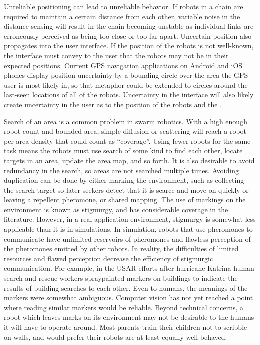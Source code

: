 \documentclass[]{article}
\begin{document}
Unreliable positioning can lead to unreliable behavior. 
If robots in a chain are required to maintain a certain distance from each other, variable noise in the distance sensing will result in the chain becoming unstable as individual links are erroneously perceived as being too close or too far apart. 
Uncertain position also propagates into the user interface. 
If the position of the robots is not well-known, the interface must convey to the user that the robots may not be in their expected positions. 
Current GPS navigation applications on Android and iOS phones display position uncertainty by a bounding circle over the area the GPS user is most likely in, so that metaphor could be extended to circles around the last-seen locations of all of the robots. 
Uncertainty in the interface will also likely create uncertainty in the user as to the position of the robots and the . 

Search of an area is a common problem in swarm robotics.
With a high enough robot count and bounded area, simple diffusion or scattering will reach a robot per area density that could count as ``coverage''. 
Using fewer robots for the same task means the robots must use search of some kind to find each other, locate targets in an area, update the area map, and so forth. 
It is also desirable to avoid redundancy in the search, so areas are not searched multiple times.
Avoiding duplication can be done by either marking the environment, such as collecting the search target so later seekers detect that it is scarce and move on quickly or leaving a repellent pheromone, or shared mapping.
The use of markings on the environment is known as stigmurgy, and has considerable coverage in the literature. 
However, in a real application environment, stigmurgy is somewhat less applicable than it is in simulations. 
In simulation, robots that use pheromones to communicate have unlimited reservoirs of pheromones and flawless perception of the pheromones emitted by other robots. 
In reality, the difficulties of limited resources and flawed perception decrease the efficiency of stigmurgic communication. 
For example, in the USAR efforts after hurricane Katrina human search and rescue workers spraypainted markers on buildings to indicate the results of building searches to each other. 
Even to humans, the meanings of the markers were somewhat ambiguous. 
Computer vision has not yet reached a point where reading similar markers would be reliable. 
Beyond technical concerns, a robot which leaves marks on its environment may not be desirable to the humans it will have to operate around. 
Most parents train their children not to scribble on walls, and would prefer their robots are at least equally well-behaved. 
\end{document}
